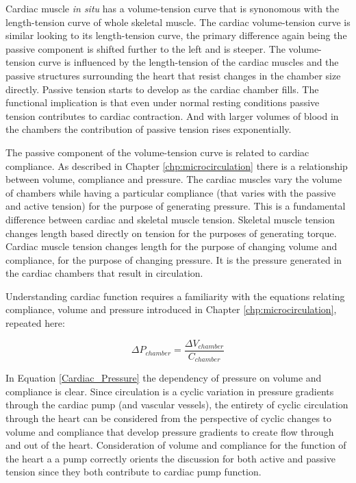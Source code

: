 Cardiac muscle \textit{in situ} has a volume-tension curve that is synonomous with the length-tension curve of whole skeletal muscle. The cardiac volume-tension curve is similar looking to its length-tension curve, the primary difference again being the passive component is shifted further to the left and is steeper. The volume-tension curve is influenced by the length-tension of the cardiac muscles and the passive structures surrounding the heart that resist changes in the chamber size directly. Passive tension starts to develop as the cardiac chamber fills. The functional implication is that even under normal resting conditions passive tension contributes to cardiac contraction. And with larger volumes of blood in the chambers the contribution of passive tension rises exponentially.

The passive component of the volume-tension curve is related to cardiac compliance. As described in Chapter \ref{chp:microcirculation} there is a relationship between volume, compliance and pressure. The cardiac muscles vary the volume of chambers while having a particular compliance (that varies with the passive and active tension) for the purpose of generating pressure. This is a fundamental difference between cardiac and skeletal muscle tension. Skeletal muscle tension changes length based directly on tension for the purposes of generating torque. Cardiac muscle tension changes length for the purpose of changing volume and compliance, for the purpose of changing pressure. It is the pressure generated in the cardiac chambers that result in circulation.

Understanding cardiac function requires a familiarity with the equations relating compliance, volume and pressure introduced in Chapter \ref{chp:microcirculation}, repeated here:

\begin{equation}
    \Delta P_{chamber} = \frac{\Delta V_{chamber}}{C_{chamber}}
    \label{Cardiac_Pressure}
\end{equation}

In Equation \ref{Cardiac_Pressure} the dependency of pressure on volume and compliance is clear. Since circulation is a cyclic variation in pressure gradients through the cardiac pump (and vascular vessels), the entirety of cyclic circulation through the heart can be considered from the perspective of cyclic changes to volume and compliance that develop pressure gradients to create flow through and out of the heart. Consideration of volume and compliance for the function of the heart a a pump correctly orients the discussion for both active and passive tension since they both contribute to cardiac pump function.

